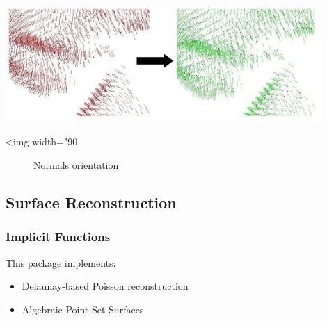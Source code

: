 \begin{center}
    \label{Surface_reconstruction_3-fig-normals_orientation_mst}
    \begin{ccTexOnly}
        \includegraphics[width=0.9\textwidth]{Surface_reconstruction_3/normals_orientation_mst} %
    \end{ccTexOnly}
    \begin{ccHtmlOnly}
        <img width="90%
    \end{ccHtmlOnly}
    \begin{figure}[h]
        \caption{Normals orientation}
    \end{figure}
\end{center}


\subsection{Surface Reconstruction}

\subsubsection{Implicit Functions}

This package implements:

\begin{itemize}
\item Delaunay-based Poisson reconstruction \cite{Kazhdan06}
\item Algebraic Point Set Surfaces \cite{Guennebaud07}
\end{itemize}

  \\
  \\

